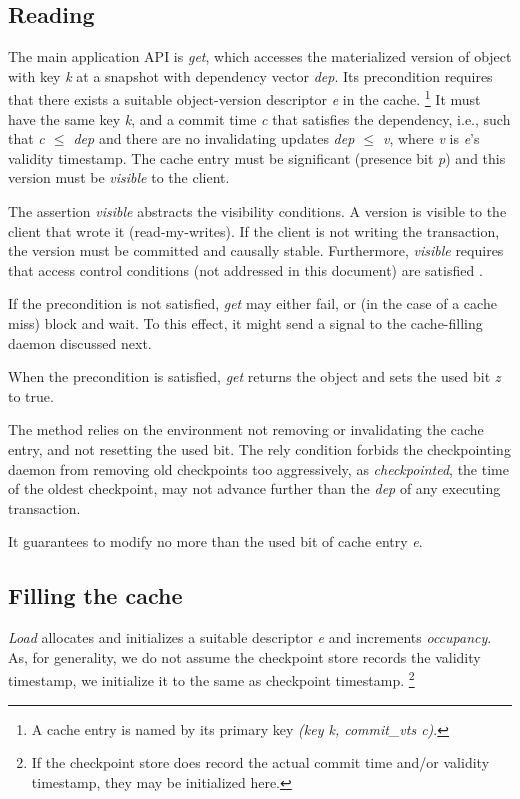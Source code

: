 \documentclass[11pt]{article}
\begin{document}
\subsection{Reading}
\label{sec:reading}

The main application API is \emph{get}, which accesses the materialized
version of object with key \emph{k} at a snapshot with dependency vector
\emph{dep}.
Its precondition requires that there exists a suitable object-version
descriptor \emph{e} in the cache.%
%
\footnote{
%
  A cache entry is named by its primary key \emph{(key k,
  commit\_vts c)}.
}
%
It must have the same key \emph{k}, and a commit time \emph{c} that
satisfies the dependency, i.e., such that \emph{c $\le$ dep} and there
are no invalidating updates \emph{dep $\le$ v}, where \emph{v} is
\emph{e}'s validity timestamp.
The cache entry must be significant (presence bit \emph{p}) and this
version must be \emph{visible} to the client.

The assertion \emph{visible} abstracts the visibility conditions.
A version is visible to the client that wrote it (read-my-writes).
If the client is not writing the transaction, the version must be
committed and causally stable.
Furthermore, \emph{visible} requires that access control conditions (not
addressed in this document) are satisfied \cite{sec:rep:1786}.

If the precondition is not satisfied, \emph{get} may either fail, or (in
the case of a cache miss) block and wait.
To this effect, it might send a signal to the cache-filling daemon
discussed next.

When the precondition is satisfied, \emph{get} returns the object and
sets the used bit \emph{z} to true.

The method relies on the environment not removing or invalidating the
cache entry, and not resetting the used bit.
The rely condition forbids the checkpointing daemon from removing old
checkpoints too aggressively, as \emph{checkpointed}, the time of the
oldest checkpoint, may not advance further than the \emph{dep} of any
executing transaction.

It guarantees to modify no more than the used bit of cache entry
\emph{e}.

\subsection{Filling the cache}
\label{sec:cache-loading}

\emph{Load} allocates and initializes a suitable descriptor \emph{e} and
increments \emph{occupancy}.
As, for generality, we do not assume the checkpoint store records the
validity timestamp, we initialize it to the same as checkpoint
timestamp.%
%
\footnote{
%
  If the checkpoint store does record the actual commit time
  and{\slash}or validity timestamp, they may be initialized here.
}
\end{document}
